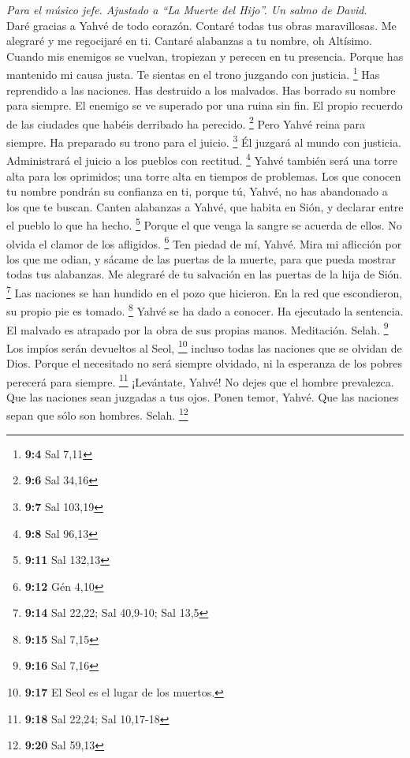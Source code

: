 \begin{paracol}{2}
\emph{Para el músico jefe. Ajustado a ``La Muerte del Hijo''. Un salmo
de David.}\\
 Daré gracias a Yahvé de todo corazón. Contaré todas tus
obras maravillosas.  Me alegraré y me regocijaré en ti.
Cantaré alabanzas a tu nombre, oh Altísimo.  Cuando mis
enemigos se vuelvan, tropiezan y perecen en tu presencia. 
Porque has mantenido mi causa justa. Te sientas en el trono juzgando con
justicia. \footnote{\textbf{9:4} Sal 7,11}  Has reprendido
a las naciones. Has destruido a los malvados. Has borrado su nombre para
siempre.  El enemigo se ve superado por una ruina sin fin.
El propio recuerdo de las ciudades que habéis derribado ha perecido.
\footnote{\textbf{9:6} Sal 34,16}  Pero Yahvé reina para
siempre. Ha preparado su trono para el juicio. \footnote{\textbf{9:7}
  Sal 103,19}  Él juzgará al mundo con justicia.
Administrará el juicio a los pueblos con rectitud. \footnote{\textbf{9:8}
  Sal 96,13}  Yahvé también será una torre alta para los
oprimidos; una torre alta en tiempos de problemas.  Los
que conocen tu nombre pondrán su confianza en ti, porque tú, Yahvé, no
has abandonado a los que te buscan.  Canten alabanzas a
Yahvé, que habita en Sión, y declarar entre el pueblo lo que ha hecho.
\footnote{\textbf{9:11} Sal 132,13}  Porque el que venga
la sangre se acuerda de ellos. No olvida el clamor de los afligidos.
\footnote{\textbf{9:12} Gén 4,10}  Ten piedad de mí,
Yahvé. Mira mi aflicción por los que me odian, y sácame de las puertas
de la muerte,  para que pueda mostrar todas tus
alabanzas. Me alegraré de tu salvación en las puertas de la hija de
Sión. \footnote{\textbf{9:14} Sal 22,22; Sal 40,9-10; Sal 13,5}
 Las naciones se han hundido en el pozo que hicieron. En
la red que escondieron, su propio pie es tomado. \footnote{\textbf{9:15}
  Sal 7,15}  Yahvé se ha dado a conocer. Ha ejecutado la
sentencia. El malvado es atrapado por la obra de sus propias manos.
Meditación. Selah. \footnote{\textbf{9:16} Sal 7,16}  Los
impíos serán devueltos al Seol, \footnote{\textbf{9:17} El Seol es el
  lugar de los muertos.} incluso todas las naciones que se olvidan de
Dios.  Porque el necesitado no será siempre olvidado, ni
la esperanza de los pobres perecerá para siempre. \footnote{\textbf{9:18}
  Sal 22,24; Sal 10,17-18}  ¡Levántate, Yahvé! No dejes
que el hombre prevalezca. Que las naciones sean juzgadas a tus ojos.
 Ponen temor, Yahvé. Que las naciones sepan que sólo son
hombres. Selah. \footnote{\textbf{9:20} Sal 59,13}


\end{paracol}
